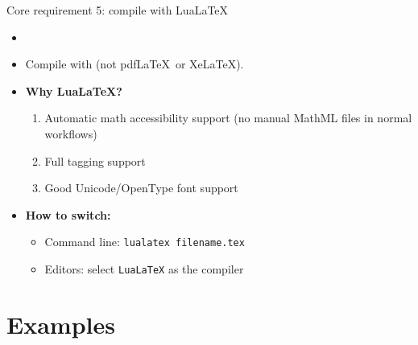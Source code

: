 \begin{frame}{Core requirement 5: compile with Lua\LaTeX}
\begin{itemize}
\item {}
\item Compile with  (not pdf\LaTeX\ or Xe\LaTeX).

\bigskip

\item \textbf{Why Lua\LaTeX?}
  \begin{enumerate}
  \item Automatic math accessibility support (no manual MathML files in normal workflows)
  \item Full tagging support
  \item Good Unicode/OpenType font support
  \end{enumerate}

\bigskip

\item \textbf{How to switch:}
  \begin{itemize}
  \item Command line: \texttt{lualatex filename.tex}
  \item Editors: select \texttt{LuaLaTeX} as the compiler
  \end{itemize}
\end{itemize}
\end{frame}

\section{Examples}

